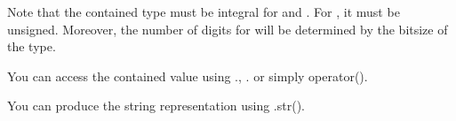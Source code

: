 Note that the contained type must be integral for {\ttfamily {}} and {\ttfamily {}}. For {\ttfamily {}}, it must be unsigned. Moreover, the number of digits for {\ttfamily {}} will be determined by the bitsize of the type.

You can access the contained value using {\ttfamily .}, {\ttfamily .} or simply {\ttfamily operator()}.

You can produce the string representation using {\ttfamily .str()}. 